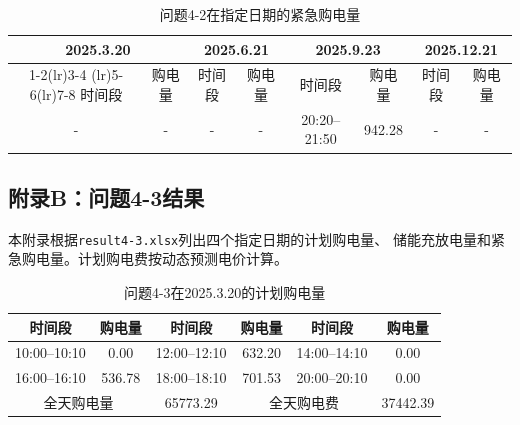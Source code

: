 \documentclass[UTF8]{ctexart}
\begin{document}
    \begin{table}[htbp]
        \centering
        \caption{问题4-2在指定日期的紧急购电量}
        \label{tab:q42_emergency}
        \begin{tabular}{cccccccc}
            \toprule
            \multicolumn{2}{c}{2025.3.20} &
            \multicolumn{2}{c}{2025.6.21} &
            \multicolumn{2}{c}{2025.9.23} &
            \multicolumn{2}{c}{2025.12.21} \\
            \cmidrule(lr){1-2}\cmidrule(lr){3-4}
            \cmidrule(lr){5-6}\cmidrule(lr){7-8}
            时间段 & 购电量 & 时间段 & 购电量 &
            时间段 & 购电量 & 时间段 & 购电量 \\
            \midrule
            - & - & - & - & 20:20--21:50 & 942.28 & - & - \\
            \bottomrule
        \end{tabular}
    \end{table}
    
    \clearpage
    
    \subsection*{附录B：问题4-3结果}
    
    本附录根据\texttt{result4-3.xlsx}列出四个指定日期的计划购电量、
    储能充放电量和紧急购电量。计划购电费按动态预测电价计算。\par
    
    \begin{table}[htbp]
        \centering
        \caption{问题4-3在2025.3.20的计划购电量}
        \label{tab:q43_tenminute_0320}
        \begin{tabular}{cccccc}
            \toprule
            时间段 & 购电量 & 时间段 & 购电量 & 时间段 & 购电量 \\
            \midrule
            10:00--10:10 & 0.00 & 12:00--12:10 & 632.20 & 14:00--14:10 & 0.00 \\
            16:00--16:10 & 536.78 & 18:00--18:10 & 701.53 & 20:00--20:10 & 0.00 \\
            \midrule
            \multicolumn{2}{c}{全天购电量} & 65773.29 &
            \multicolumn{2}{c}{全天购电费} & 37442.39 \\
            \bottomrule
        \end{tabular}
    \end{table}
    
\end{document}
